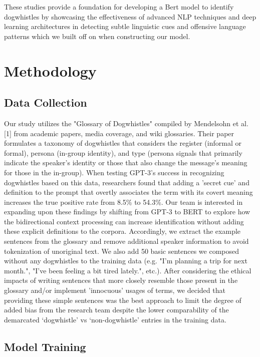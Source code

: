 \documentclass[11pt,a4paper]{article}
\begin{document}
These studies provide a foundation for developing a Bert model to identify dogwhistles by showcasing the effectiveness of advanced NLP techniques and deep learning architectures in detecting subtle linguistic cues and offensive language patterns which we built off on when constructing our model.\\



\section{Methodology}
\subsection{Data Collection}
 Our study utilizes the "Glossary of Dogwhistles" compiled by Mendelsohn et al. [1] from academic papers, media coverage, and wiki glossaries. Their paper formulates a taxonomy of dogwhistles that considers the register (informal or formal), persona (in-group identity), and type (persona signals that primarily indicate the speaker's identity or those that also change the message's meaning for those in the in-group). When testing GPT-3's success in recognizing dogwhistles based on this data, researchers found that adding a 'secret cue' and definition to the prompt that overtly associates the term with its covert meaning increases the true positive rate from 8.5\% to 54.3\%.  Our team is interested in expanding upon these findings by shifting from GPT-3 to BERT to explore how the bidirectional context processing can increase identification without adding these explicit definitions to the corpora. Accordingly, we extract the example sentences from the glossary and remove additional speaker information to avoid tokenization of unoriginal text. We also add 50 basic sentences we composed without any dogwhistles to the training data (e.g. "I'm planning a trip for next month.", "I've been feeling a bit tired lately.", etc.). After considering the ethical impacts of writing sentences that more closely resemble those present in the glossary and/or implement 'innocuous' usages of terms, we decided that providing these simple sentences was the best approach to limit the degree of added bias from the research team despite the lower comparability of the demarcated ‘dogwhistle’ vs ‘non-dogwhistle' entries in the training data. 


\subsection{Model Training}
\end{document}
